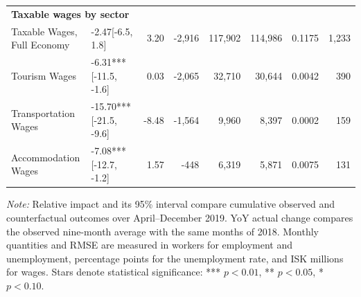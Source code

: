 \begin{table}[htbp]
{\begin{tabular}[t]{llrrrrrr}
\midrule
\multicolumn{8}{l}{\textbf{Taxable wages by sector}}\\
Taxable Wages, Full Economy & -2.47\hspace{0.6em}[-6.5, 1.8] & 3.20 & -2,916 & 117,902 & 114,986 & 0.1175 & 1,233 \\
Tourism Wages & -6.31***\hspace{0.6em}[-11.5, -1.6] & 0.03 & -2,065 & 32,710 & 30,644 & 0.0042 & 390 \\
Transportation Wages & -15.70***\hspace{0.6em}[-21.5, -9.6] & -8.48 & -1,564 & 9,960 & 8,397 & 0.0002 & 159 \\
Accommodation Wages & -7.08***\hspace{0.6em}[-12.7, -1.2] & 1.57 & -448 & 6,319 & 5,871 & 0.0075 & 131 \\
\bottomrule
\end{tabular}
}
\begin{minipage}{\textwidth}
\raggedright\scriptsize \textit{Note:} Relative impact and its 95\% interval compare cumulative observed and counterfactual outcomes over April--December 2019. YoY actual change compares the observed nine-month average with the same months of 2018. Monthly quantities and RMSE are measured in workers for employment and unemployment, percentage points for the unemployment rate, and ISK millions for wages. Stars denote statistical significance: *** $p<0.01$, ** $p<0.05$, * $p<0.10$.
\end{minipage}
\end{table}
